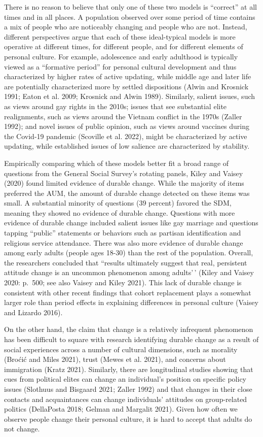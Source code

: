 \documentclass[
  12pt,
]{article}
\begin{document}
There is no reason to believe that only one of these two models is
``correct'' at all times and in all places. A population observed over
some period of time contains a mix of people who are noticeably changing
and people who are not. Instead, different perspectives argue that each
of these ideal-typical models is more operative at different times, for
different people, and for different elements of personal culture. For
example, adolescence and early adulthood is typically viewed as a
``formative period'' for personal cultural development and thus
characterized by higher rates of active updating, while middle age and
later life are potentially characterized more by settled dispositions
(Alwin and Krosnick 1991; Eaton et al. 2009; Krosnick and Alwin 1989).
Similarly, salient issues, such as views around gay rights in the 2010s;
issues that see substantial elite realignments, such as views around the
Vietnam conflict in the 1970s (Zaller 1992); and novel issues of public
opinion, such as views around vaccines during the Covid-19 pandemic
(Scoville et al. 2022), might be characterized by active updating, while
established issues of low salience are characterized by stability.

Empirically comparing which of these models better fit a broad range of
questions from the General Social Survey's rotating panels, Kiley and
Vaisey (2020) found limited evidence of durable change. While the
majority of items preferred the AUM, the amount of durable change
detected on these items was small. A substantial minority of questions
(39 percent) favored the SDM, meaning they showed no evidence of durable
change. Questions with more evidence of durable change included salient
issues like gay marriage and questions tapping ``public'' statements or
behaviors such as partisan identification and religious service
attendance. There was also more evidence of durable change among early
adults (people ages 18-30) than the rest of the population. Overall, the
researchers concluded that ``results ultimately suggest that real,
persistent attitude change is an uncommon phenomenon among adults'\,'
(Kiley and Vaisey 2020: p.~500; see also Vaisey and Kiley 2021). This
lack of durable change is consistent with other recent findings that
cohort replacement plays a somewhat larger role than period effects in
explaining differences in personal culture (Vaisey and Lizardo 2016).

On the other hand, the claim that change is a relatively infrequent
phenomenon has been difficult to square with research identifying
durable change as a result of social experiences across a number of
cultural dimensions, such as morality (Broćić and Miles 2021), trust
(Mewes et al. 2021), and concerns about immigration (Kratz 2021).
Similarly, there are longitudinal studies showing that cues from
political elites can change an individual's position on specific policy
issues (Slothuus and Bisgaard 2021; Zaller 1992) and that changes in
their close contacts and acquaintances can change individuals' attitudes
on group-related politics (DellaPosta 2018; Gelman and Margalit 2021).
Given how often we observe people change their personal culture, it is
hard to accept that adults do not change.
\end{document}
